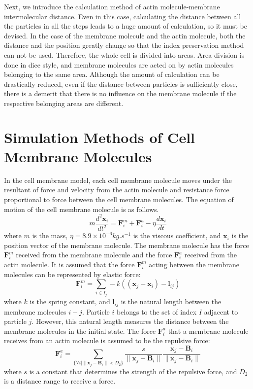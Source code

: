 \documentclass[a4paper,12pt]{book}
\begin{document}
Next, we introduce the calculation method of actin molecule-membrane intermolecular distance. Even in this case, calculating the distance between all the particles in all the steps leads to a huge amount of calculation, so it must be devised. In the case of the membrane molecule and the actin molecule, both the distance and the position greatly change so that the index preservation method can not be used. Therefore, the whole cell is divided into areas. Area division is done in dice style, and membrane molecules are acted on by actin molecules belonging to the same area. Although the amount of calculation can be drastically reduced, even if the distance between particles is sufficiently close, there is a demerit that there is no influence on the membrane molecule if the respective belonging areas are different.


\section{Simulation Methods of Cell Membrane Molecules}
In the cell membrane model, each cell membrane molecule moves under the resultant of force and velocity from the actin molecule and resistance force proportional to force between the cell membrane molecules. The equation of motion of the cell membrane molecule is as follows.
\begin{equation}
m\frac{d^2\bm{x}_i}{dt^2} = \bm{F}^m_i +  \bm{F}^a_i - \eta \frac{d\bm{x}_i}{dt}
\end{equation}
where  $m$ is the mass, $\eta = 8.9\times 10^{-6} \si{kg.s^{-1}}$ is the viscous coefficient, and $\bm{x}_i$ is the position vector of the membrane molecule. The membrane molecule has the force  $\bm{F}^m_i$ received from the membrane molecule and the force  $\bm{F}^a_i$ received from the actin molecule. It is assumed that the force  $\bm{F}^m_i$ acting between the membrane molecules can be represented by elastic force:
\begin{equation}
\bm{F}^m_i = \sum_{i \in I_j}  -k((\bm{x}_j -\bm{x}_i )-\bm{l}_{ij} )
\end{equation}
where $k$ is the spring constant, and $\bm{l}_{ij}$ is the natural length between the membrane molecules $i-j$. Particle $i$ belongs to the set of index $I$ adjacent to particle $j$. However, this natural length measures the distance between the membrane molecules in the initial state. The force  $\bm{F}^a_i$ that a membrane molecule receives from an actin molecule is assumed to be the repulsive force:
\begin{equation}
\bm{F}^a_i = \sum_{\{ \forall i | \| \bm{x}_j - \bm{B}_i \|<D_2\}} \frac{s}{\|\bm{x}_j -\bm{B}_i \|} \frac{\bm{x}_j -\bm{B}_i }{\|\bm{x}_j -\bm{B}_i \|}
\end{equation}
where $s$ is a constant that determines the strength of the repulsive force, and $D_2$ is a distance range to receive a force.
\end{document}
